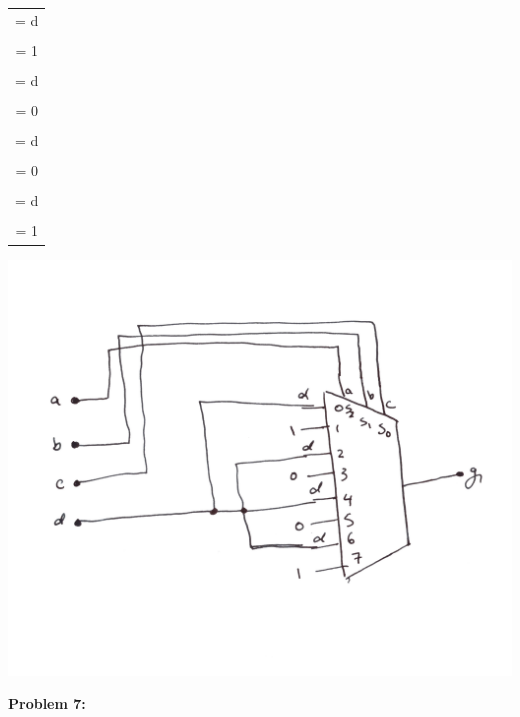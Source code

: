 \documentclass{article}
\begin{document}
\begin{center}
        \begin{tabular} {c}
            \\
          = d \\
            \\
          = 1 \\
            \\
          = d \\
            \\
          = 0 \\
            \\
          = d \\
            \\
          = 0 \\
            \\
          = d \\
            \\
          = 1 
      \end{tabular}
    \end{center}

    \begin{center}
        \includegraphics[width=\linewidth]{HW3_q6.png}
    \end{center}


    \textbf{Problem 7:}
\end{document}
